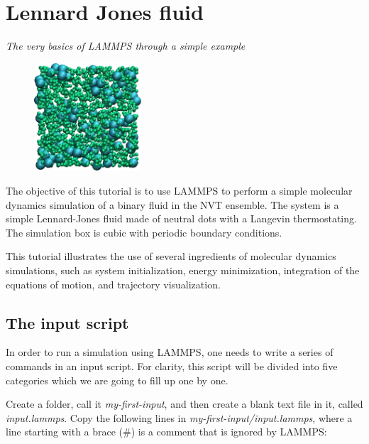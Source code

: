 \chapter{Lennard Jones fluid}

\vspace{-1cm} \noindent \textcolor{graytitle}{\textit{{\Large The very basics of LAMMPS through a simple example}}\vspace{0.5cm} }

\noindent \hspace{-0.45cm}\begin{figure}
\includegraphics[width=4cm]{tutorials/level0/lennard-jones-fluid/binary_LJ_fluid_light.png}
\end{figure}

\noindent The objective of this tutorial is to use
LAMMPS to perform a simple molecular dynamics simulation
of a binary fluid in the NVT ensemble. The system is a simple Lennard-Jones fluid
made of neutral dots with a Langevin thermostating. The
simulation box is cubic with periodic boundary conditions.

This tutorial illustrates the use of several ingredients of
molecular dynamics simulations, such as system initialization,
energy minimization, integration of the equations of motion,
and trajectory visualization.

\section{The input script}

\noindent In order to run a simulation using LAMMPS, one needs to
write a series of commands in an input script. For clarity,
this script will be divided into five categories which we are going to
fill up one by one. 

Create a folder, call it \textit{my-first-input}, and then create a blank
text file in it, called \textit{input.lammps}. Copy the following lines
in \textit{my-first-input/input.lammps}, where a line starting with a brace ($\#$)
is a comment that is ignored by LAMMPS:

